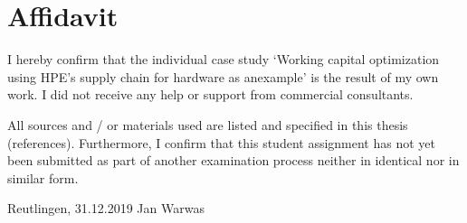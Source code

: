 
\clearpage
\chapter*{Affidavit}


I hereby confirm that the individual case study ‘Working capital optimization using HPE’s supply chain for hardware as anexample’ is the result of my own work. I did not receive any help or support from commercial consultants.

All sources and / or materials used are listed and specified in this thesis (references). Furthermore, I confirm that this student assignment has not yet been submitted as part of another examination process neither in identical nor in similar form.\\

\vspace{5em}

Reutlingen, 31.12.2019 \hfill Jan Warwas
